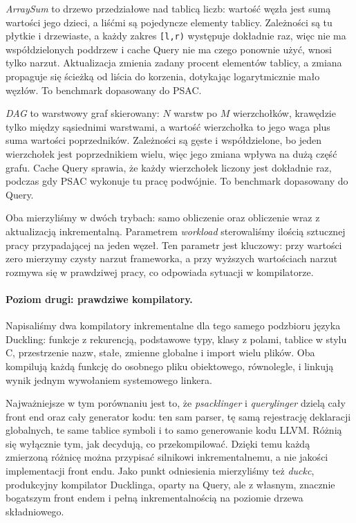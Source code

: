 \documentclass[11pt,a4paper]{article}
\begin{document}
\emph{ArraySum} to drzewo przedziałowe nad tablicą liczb: wartość węzła jest sumą
wartości jego dzieci, a liśćmi są pojedyncze elementy tablicy. Zależności są tu
płytkie i drzewiaste, a każdy zakres \texttt{[l,r)} występuje dokładnie raz, więc
nie ma współdzielonych poddrzew i cache Query nie ma czego ponownie użyć, wnosi
tylko narzut. Aktualizacja zmienia zadany procent elementów tablicy, a zmiana
propaguje się ścieżką od liścia do korzenia, dotykając logarytmicznie mało
węzłów. To benchmark dopasowany do PSAC.

\emph{DAG} to warstwowy graf skierowany: \(N\) warstw po \(M\) wierzchołków,
krawędzie tylko między sąsiednimi warstwami, a wartość wierzchołka to jego waga
plus suma wartości poprzedników. Zależności są gęste i współdzielone, bo jeden
wierzchołek jest poprzednikiem wielu, więc jego zmiana wpływa na dużą część
grafu. Cache Query sprawia, że każdy wierzchołek liczony jest dokładnie raz,
podczas gdy PSAC wykonuje tu pracę podwójnie. To benchmark dopasowany do Query.

Oba mierzyliśmy w dwóch trybach: samo obliczenie oraz obliczenie wraz
z aktualizacją inkrementalną. Parametrem \emph{workload} sterowaliśmy ilością
sztucznej pracy przypadającej na jeden węzeł. Ten parametr jest kluczowy: przy
wartości zero mierzymy czysty narzut frameworka, a przy wyższych wartościach
narzut rozmywa się w prawdziwej pracy, co odpowiada sytuacji w kompilatorze.

\paragraph{Poziom drugi: prawdziwe kompilatory.} Napisaliśmy dwa kompilatory
inkrementalne dla tego samego podzbioru języka Duckling: funkcje z rekurencją,
podstawowe typy, klasy z polami, tablice w stylu C, przestrzenie nazw, stałe,
zmienne globalne i import wielu plików. Oba kompilują każdą funkcję do osobnego
pliku obiektowego, równolegle, i linkują wynik jednym wywołaniem systemowego
linkera.

Najważniejsze w tym porównaniu jest to, że \emph{psacklinger} i %
\emph{querylinger} dzielą cały front end oraz cały generator kodu: ten sam
parser, tę samą rejestrację deklaracji globalnych, te same tablice symboli i to
samo generowanie kodu LLVM. Różnią się wyłącznie tym, jak decydują, co
przekompilować. Dzięki temu każdą zmierzoną różnicę można przypisać silnikowi
inkrementalnemu, a nie jakości implementacji front endu. Jako punkt odniesienia
mierzyliśmy też \emph{duckc}, produkcyjny kompilator Ducklinga, oparty na Query,
ale z własnym, znacznie bogatszym front endem i pełną inkrementalnością na
poziomie drzewa składniowego.
\end{document}
